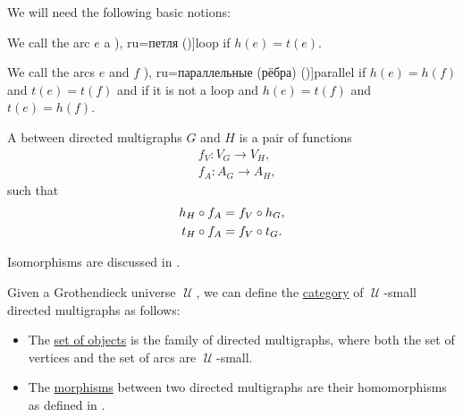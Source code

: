 \begin{definition}
  We will need the following basic notions:
  \begin{thmenum}[resume=def:directed_multigraph]
     We call the arc \( e \) a \term[bg=примка (\cite[7]{Мирчев2001Графи}), ru=петля (\cite[279]{Емеличев1990Графы})]{loop} if \( h(e) = t(e) \).

    \medskip

     We call the arcs \( e \) and \( f \) \term[bg=паралелни (ребра) (\cite[7]{Мирчев2001Графи}), ru=параллельные (рёбра) (\cite[279]{Емеличев1990Графы})]{parallel} if \( h(e) = h(f) \) and \( t(e) = t(f) \) and  if it is not a loop and \( h(e) = t(f) \) and \( t(e) = h(f) \).

     A  between directed multigraphs \( G \) and \( H \) is a pair of functions
    \begin{align*}
      &f_V: V_G \to V_H, \\
      &f_A: A_G \to A_H,
    \end{align*}
    such that
    \begin{subequations}
      \begin{align}
        h_H \bincirc f_A &= f_V \bincirc h_G, \label{eq:def:directed_multigraph/homomorphism/head} \\
        t_H \bincirc f_A &= f_V \bincirc t_G. \label{eq:def:directed_multigraph/homomorphism/tail}
      \end{align}
    \end{subequations}

    Isomorphisms are discussed in .

     Given a Grothendieck universe \( \mscrU \), we can define the \hyperref[def:category]{category} of \( \mscrU \)-small directed multigraphs as follows:
    \begin{itemize}
      \item The \hyperref[def:category/objects]{set of objects} is the family of directed multigraphs, where both the set of vertices and the set of arcs are \( \mscrU \)-small.

      \item The \hyperref[def:category/morphisms]{morphisms} between two directed multigraphs are their homomorphisms as defined in .


\end{itemize}
\end{thmenum}
\end{definition}
